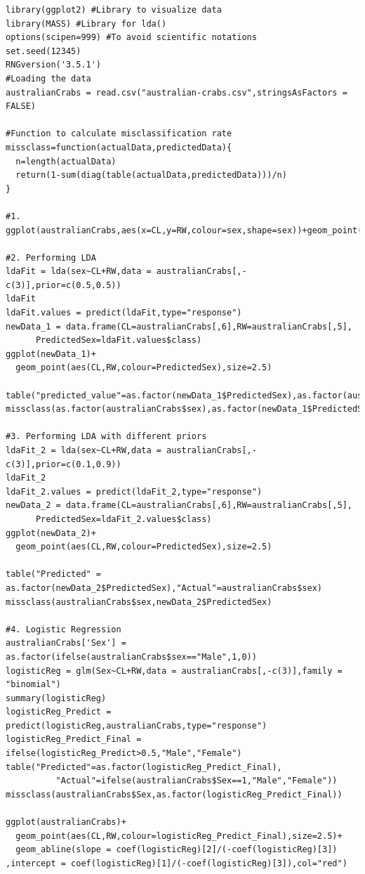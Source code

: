 \documentclass[a4paper,10pt]{article}
\begin{document}
\begin{lstlisting}
library(ggplot2) #Library to visualize data
library(MASS) #Library for lda()
options(scipen=999) #To avoid scientific notations
set.seed(12345)
RNGversion('3.5.1')
#Loading the data
australianCrabs = read.csv("australian-crabs.csv",stringsAsFactors = FALSE)

#Function to calculate misclassification rate
missclass=function(actualData,predictedData){
  n=length(actualData)
  return(1-sum(diag(table(actualData,predictedData)))/n)
}

#1. 
ggplot(australianCrabs,aes(x=CL,y=RW,colour=sex,shape=sex))+geom_point()

#2. Performing LDA
ldaFit = lda(sex~CL+RW,data = australianCrabs[,-c(3)],prior=c(0.5,0.5))
ldaFit
ldaFit.values = predict(ldaFit,type="response")
newData_1 = data.frame(CL=australianCrabs[,6],RW=australianCrabs[,5],
      PredictedSex=ldaFit.values$class)
ggplot(newData_1)+
  geom_point(aes(CL,RW,colour=PredictedSex),size=2.5)

table("predicted_value"=as.factor(newData_1$PredictedSex),as.factor(australianCrabs$sex))
missclass(as.factor(australianCrabs$sex),as.factor(newData_1$PredictedSex))

#3. Performing LDA with different priors
ldaFit_2 = lda(sex~CL+RW,data = australianCrabs[,-c(3)],prior=c(0.1,0.9))
ldaFit_2
ldaFit_2.values = predict(ldaFit_2,type="response")
newData_2 = data.frame(CL=australianCrabs[,6],RW=australianCrabs[,5],
      PredictedSex=ldaFit_2.values$class)
ggplot(newData_2)+
  geom_point(aes(CL,RW,colour=PredictedSex),size=2.5)

table("Predicted" = as.factor(newData_2$PredictedSex),"Actual"=australianCrabs$sex)
missclass(australianCrabs$sex,newData_2$PredictedSex)

#4. Logistic Regression
australianCrabs['Sex'] = as.factor(ifelse(australianCrabs$sex=="Male",1,0))
logisticReg = glm(Sex~CL+RW,data = australianCrabs[,-c(3)],family = "binomial")
summary(logisticReg)
logisticReg_Predict = predict(logisticReg,australianCrabs,type="response")
logisticReg_Predict_Final = ifelse(logisticReg_Predict>0.5,"Male","Female")
table("Predicted"=as.factor(logisticReg_Predict_Final),
          "Actual"=ifelse(australianCrabs$Sex==1,"Male","Female"))
missclass(australianCrabs$Sex,as.factor(logisticReg_Predict_Final))

ggplot(australianCrabs)+
  geom_point(aes(CL,RW,colour=logisticReg_Predict_Final),size=2.5)+
  geom_abline(slope = coef(logisticReg)[2]/(-coef(logisticReg)[3]) ,intercept = coef(logisticReg)[1]/(-coef(logisticReg)[3]),col="red")

\end{lstlisting}
\end{document}
